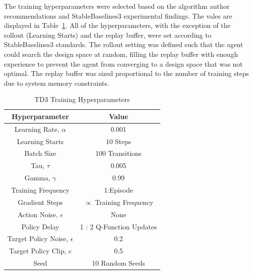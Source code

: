 \documentclass[10pt,twocolumn,letterpaper]{article}
\begin{document}
The training hyperparameters were selected based on the algorithm author recommendations and StableBaselines3 experimental findings. The vales are displayed in Table~\ref{tab:training_hyperameters}. All of the hyperparameters, with the exception of the rollout (Learning Starts) and the replay buffer, were set according to StableBaselines3 standards. The rollout setting was defined such that the agent could search the design space at random, filling the replay buffer with enough experience to prevent the agent from converging to a design space that was not optimal. The replay buffer was sized proportional to the number of training steps due to system memory constraints.  
%
\begin{table}[t]
        \caption{TD3 Training Hyperparameters}
        \vspace{-4mm}
        \label{tab:training_hyperameters}
        \begin{center}
        \begin{tabular}{|c||c|}
        \hline
        Hyperparameter                     & Value                           \\
        \hline
        Learning Rate, $\alpha$         & 0.001                            \\
        Learning Starts                 & 10 Steps                        \\
        Batch Size                      & 100 Transitions                 \\
        Tau, $\tau$                     & 0.005                           \\
        Gamma, $\gamma$                 & 0.99                            \\
        Training Frequency              & 1:Episode                       \\
        Gradient Steps                  & $\propto$ Training Frequency    \\
        Action Noise,  $\epsilon$       & None                            \\
        Policy Delay                    & 1 : 2 Q-Function Updates        \\
        Target Policy Noise, $\epsilon$ & 0.2                             \\
        Target Policy Clip, $c$         & 0.5                             \\
        Seed                            & 10 Random Seeds                 \\
        \hline
        \end{tabular}
        \end{center}
        \vspace{-5mm}
\end{table}
\end{document}
